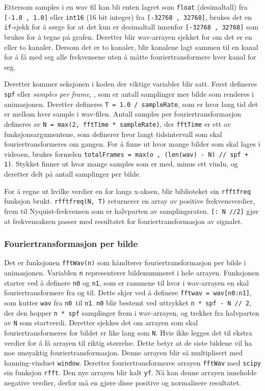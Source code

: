 Ettersom samples i en wav fil kan bli enten lagret som \texttt{float} (desimaltall) fra 
\texttt{[-1.0 , 1.0]} eller \texttt{int16} (16 bit integer) fra \texttt{[-32768 , 32768]}, brukes det
en \texttt{if}-sjekk for å sørge for at det kun er desimaltall innenfor \texttt{[-32768 , 32768]} 
som brukes for å tegne på grafen. Deretter blir wav-arrayen sjekket for om det er en eller 
to kanaler. Dersom det er to kanaler, blir kanalene lagt sammen til en kanal for å få med seg
alle frekvensene uten å måtte fouriertransformere hver kanal for seg. 

Deretter kommer seksjonen i koden der viktige variabler blir satt. Først defineres \texttt{spf} eller \textit{samples per frame}, 
, som er antall samplinger mer bilde som renderes i animasjonen. Deretter defineres \texttt{T = 1.0 / sampleRate}, som er 
hvor lang tid det er mellom hver sample i wav-filen. Antall samples per fouriertransformasjon defineres av 
\texttt{N = max(2, fftTime * sampleRate)}, der \texttt{fftTime} er ett av funksjonsargumentene, som definerer
hvor langt tidsintervall som skal fouriertransformeres om gangen. For å finne ut hvor mange bilder som skal lages
i videoen, brukes formelen  \texttt{totalFrames = max(o , (len(wav) - N) // spf + 1)}. Stykket finner ut hvor mange samples 
som er med, minus ett vindu, og deretter delt på antall samplinger per bilde. 

For å regne ut hvilke verdier en for langs x-aksen, blir  biblioteket sin \texttt{rfftfreq} funksjon brukt.
\texttt{rfftfreq(N, T)} returnerer en array av positive frekvensverdier, frem til Nyquist-frekvensen som er halvparten
av samplingsraten. \texttt{[: N //2]} gjør at frekvensaksen passer med resultatet for fouriertransformasjon av signalet.

\subsubsection{Fouriertransformasjon per bilde}

Det er funksjonen \texttt{fftWav(n)} som håndterer fouriertransformasjon per bilde i animasjonen. Variablen \texttt{n}
representerer bildenummeret i hele arrayen. Funksjonen starter ved å definere \texttt{n0} og \texttt{n1}, som er rammene
til hvor i wav-arrayen en skal fouriertransformere fra og til. Dette skjer ved å definere \texttt{fftwav = wav[n0:n1]}, 
som kutter \texttt{wav} fra \texttt{n0} til \texttt{n1}. \texttt{n0} blir bestemt ved uttrykket \texttt{n * spf - N // 2},
der den hopper \texttt{n * spf} samplinger frem i wav-arrayen, og trekker fra halvparten av \texttt{N} som startverdi.
Deretter sjekkes det om arrayen som skal fouriertransformeres for bildet er like lang som \texttt{N}. Hvis ikke legges
det til ekstra verdier for å få arrayen til riktig størrelse. Dette betyr at de siste bildene vil ha noe unøyaktig 
fouriertransformasjon. Denne arrayen blir så multiplisert med hanning-vinduet \texttt{window}. Deretter fouriertransformeres arrayen \texttt{fftWav} med \texttt{scipy} sin funksjon \texttt{rfft}.
Den nye arrayen blir kalt \texttt{yf}. Nå kan denne arrayen inneholde negative verdier, derfor må en gjøre disse positive og 
normalisere resultatet. 


